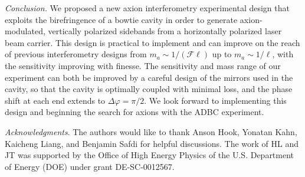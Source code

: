 \documentclass[aps,prd,nofootinbib,twocolumn,superscriptaddress,preprintnumbers,letterpaper, longbibliography]{revtex4-1}
\begin{document}
\vspace{0.2cm}
\textit{Conclusion.}
We proposed a new axion interferometry experimental design that exploits the birefringence of a bowtie cavity in order to generate axion-modulated, vertically polarized sidebands from a horizontally polarized laser beam carrier. This design is practical to implement and can improve on the reach of previous interferometry designs from $m_a \sim 1/(\mathcal{F} \ell)$ up to $m_a \sim 1/\ell$, with the sensitivity improving with finesse. The sensitivity and mass range of our experiment can both be improved by a careful design of the mirrors used in the cavity, so that the cavity is optimally coupled with minimal loss, and the phase shift at each end extends to $\Delta \varphi = \pi/2$. We look forward to implementing this design and beginning the search for axions with the ADBC experiment.

\vspace{0.2cm}
\textit{Acknowledgments}. The authors would like to thank Anson Hook, Yonatan Kahn, Kaicheng Liang, and Benjamin Safdi for helpful discussions. The work of HL and JT was supported by the Office of High Energy Physics of the U.S. Department of Energy (DOE) under grant DE-SC-0012567.

%

%
\end{document}
